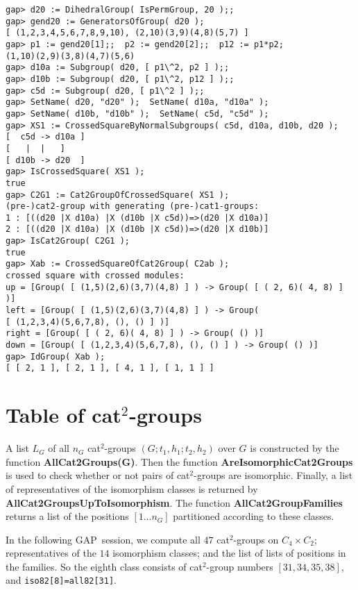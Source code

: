 \documentclass{ws-ijac}
\newcommand{\GAP}      {{\sf GAP}}
\begin{document}
\small{ 
\begin{verbatim}
gap> d20 := DihedralGroup( IsPermGroup, 20 );;
gap> gend20 := GeneratorsOfGroup( d20 ); 
[ (1,2,3,4,5,6,7,8,9,10), (2,10)(3,9)(4,8)(5,7) ]
gap> p1 := gend20[1];;  p2 := gend20[2];;  p12 := p1*p2; 
(1,10)(2,9)(3,8)(4,7)(5,6)
gap> d10a := Subgroup( d20, [ p1\^2, p2 ] );; 
gap> d10b := Subgroup( d20, [ p1\^2, p12 ] );; 
gap> c5d := Subgroup( d20, [ p1\^2 ] );; 
gap> SetName( d20, "d20" );  SetName( d10a, "d10a" ); 
gap> SetName( d10b, "d10b" );  SetName( c5d, "c5d" ); 
gap> XS1 := CrossedSquareByNormalSubgroups( c5d, d10a, d10b, d20 ); 
[  c5d -> d10a ]
[   |  |   ]
[ d10b -> d20  ]
gap> IsCrossedSquare( XS1 ); 
true
gap> C2G1 := Cat2GroupOfCrossedSquare( XS1 ); 
(pre-)cat2-group with generating (pre-)cat1-groups:
1 : [((d20 |X d10a) |X (d10b |X c5d))=>(d20 |X d10a)]
2 : [((d20 |X d10a) |X (d10b |X c5d))=>(d20 |X d10b)]
gap> IsCat2Group( C2G1 ); 
true
gap> Xab := CrossedSquareOfCat2Group( C2ab ); 
crossed square with crossed modules:
up = [Group( [ (1,5)(2,6)(3,7)(4,8) ] ) -> Group( [ ( 2, 6)( 4, 8) ] )]
left = [Group( [ (1,5)(2,6)(3,7)(4,8) ] ) -> Group(
[ (1,2,3,4)(5,6,7,8), (), () ] )]
right = [Group( [ ( 2, 6)( 4, 8) ] ) -> Group( () )]
down = [Group( [ (1,2,3,4)(5,6,7,8), (), () ] ) -> Group( () )]
gap> IdGroup( Xab ); 
[ [ 2, 1 ], [ 2, 1 ], [ 4, 1 ], [ 1, 1 ] ]
\end{verbatim}
}

\section{Table of cat$^{2}$-groups}

A list $L_G$ of all $n_G$ cat$^{2}$-groups $(G;t_1,h_1;t_2,h_2)$ over $G$ 
is constructed by the function \textbf{AllCat2Groups(G)}. 
Then the function \textbf{AreIsomorphicCat2Groups} is used to check whether 
or not pairs of cat$^{2}$-groups are isomorphic.  
Finally, a list of representatives of the isomorphism classes is returned by \textbf{AllCat2GroupsUpToIsomorphism}. 
The function \textbf{AllCat2GroupFamilies} returns a list of the positions 
$[1 \ldots n_G]$ partitioned according to these classes. 

In the following \GAP\ session, we compute all $47$ cat$^{2}$-groups on 
$C_{4} \times C_{2}$; representatives of the $14$ isomorphism classes; 
and the list of lists of positions in the families. 
So the eighth class consists of cat$^2$-group numbers $[31,34,35,38]$, 
and \texttt{iso82[8]=all82[31]}. 
\end{document}
